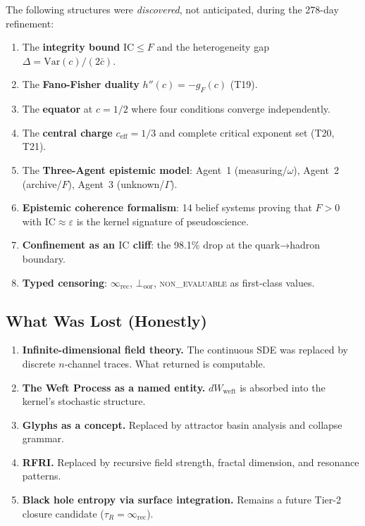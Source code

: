 \documentclass[
  aps,
  prd,
  preprint,
  superscriptaddress,
  nofootinbib,
  floatfix,
  longbibliography
]{revtex4-2}
\newcommand{\tR}{\tau_{\!R}}
\newcommand{\Gam}{\Gamma}
\newcommand{\eps}{\varepsilon}
\newcommand{\regime}[1]{\textrm{\upshape\scshape#1}}
\newcommand{\IC}{\mathrm{IC}}
\newcommand{\Fid}{F}
\newcommand{\Drft}{\omega}
\newcommand{\ceff}{c_{\mathrm{eff}}}
\newcommand{\gFisher}{g_{\!F}}
\newcommand{\hetgap}{\Delta}
\begin{document}
The following structures were \emph{discovered}, not anticipated,
during the 278-day refinement:
\begin{enumerate}[nosep,leftmargin=*]
  \item The \textbf{integrity bound} $\IC \leq \Fid$ and the
    heterogeneity gap $\hetgap = \mathrm{Var}(c)/(2\bar{c})$.
  \item The \textbf{Fano-Fisher duality} $h''(c) = -\gFisher(c)$
    (T19).
  \item The \textbf{equator} at $c = 1/2$ where four conditions
    converge independently.
  \item The \textbf{central charge} $\ceff = 1/3$ and complete
    critical exponent set (T20, T21).
  \item The \textbf{Three-Agent epistemic model}:
    Agent~1 (measuring/$\Drft$), Agent~2 (archive/$\Fid$),
    Agent~3 (unknown/$\Gam$).
  \item \textbf{Epistemic coherence formalism}: 14 belief systems
    proving that $\Fid > 0$ with $\IC \approx \eps$ is the
    kernel signature of pseudoscience.
  \item \textbf{Confinement as an $\IC$ cliff}: the 98.1\% drop
    at the quark→hadron boundary.
  \item \textbf{Typed censoring}: $\infty_{\mathrm{rec}}$,
    $\bot_{\mathrm{oor}}$, \regime{non\_evaluable}
    as first-class values.
\end{enumerate}

\subsection{What Was Lost (Honestly)}

\begin{enumerate}[nosep,leftmargin=*]
  \item \textbf{Infinite-dimensional field theory.}
    The continuous SDE was replaced by discrete $n$-channel
    traces. What returned is computable.
  \item \textbf{The Weft Process as a named entity.}
    $dW_{\mathrm{weft}}$ is absorbed into the kernel's
    stochastic structure.
  \item \textbf{Glyphs as a concept.} Replaced by attractor
    basin analysis and collapse grammar.
  \item \textbf{RFRI.} Replaced by recursive field strength,
    fractal dimension, and resonance patterns.
  \item \textbf{Black hole entropy via surface integration.}
    Remains a future Tier-2 closure candidate
    ($\tR = \infty_{\mathrm{rec}}$).
\end{enumerate}
\end{document}
